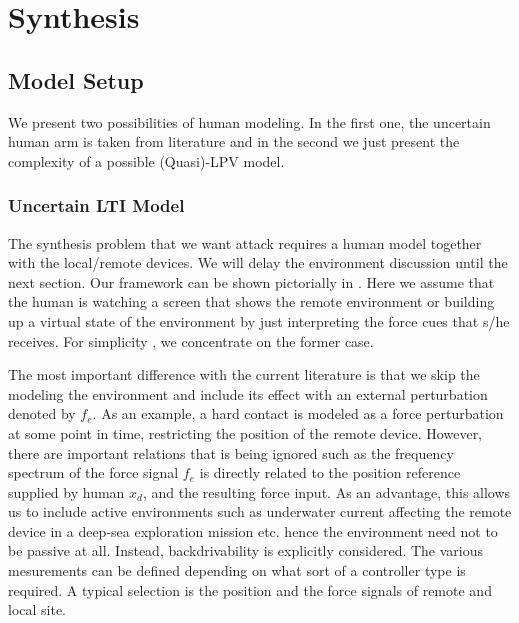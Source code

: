 \chapter{Synthesis}
\label{chap:synth}
\section{Model Setup}
We present two possibilities of human modeling. In the first one, the uncertain human arm is taken from literature and 
in the second we just present the complexity of a possible (Quasi)-LPV model. 
\subsection{Uncertain LTI Model}
The synthesis problem that we want attack requires a human model together with the local/remote 
devices. We will delay the environment discussion until the next section. Our framework can be 
shown pictorially in . Here we assume that the human is watching a screen that
shows the remote environment or building up a virtual state of the environment by just interpreting
the force cues that s/he receives. For simplicity , we concentrate on the former case.

The most important difference with the current literature is that we skip the modeling the environment
and include its effect with an external perturbation denoted by $f_e$. As an example, a hard contact 
is modeled as a force perturbation at some point in time, restricting the position of the remote 
device. However, there are important relations that is being ignored such as the frequency spectrum
of the force signal $f_e$ is directly related to the position reference supplied by human $x_d$, and 
the resulting force input. As an advantage, this allows us to include active environments such as 
underwater current affecting the remote device in a deep-sea exploration mission etc. hence the environment 
need not to be passive at all. Instead, backdrivability is explicitly considered. The various mesurements
can be defined depending on what sort of a controller type is required. A typical selection is the position
and the force signals of remote and local site. 



